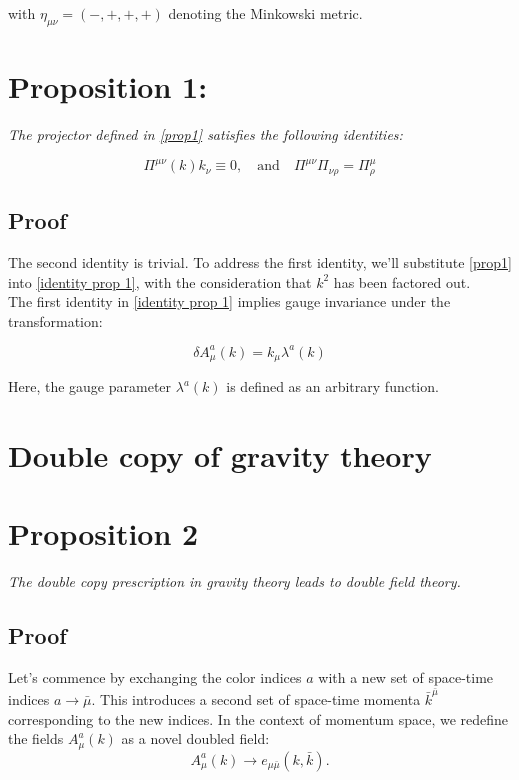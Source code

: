 \documentclass[13pt]{article}
\begin{document}
with \(\eta_{\mu \nu} = (-,+,+,+)\) denoting the Minkowski metric.

\vspace{1cm}
\section*{\textbf{Proposition 1:}} \textit{The projector defined in \eqref{prop1} satisfies the following identities:}

\begin{equation}
\Pi^{\mu \nu}(k)k_{\nu} \equiv 0, \quad \text{and} \quad \Pi^{\mu \nu}\Pi_{\nu \rho} = \Pi^{\mu}_{\rho}
\tag{11}
\label{identity prop 1}
\end{equation}

\subsection*{Proof} The second identity is trivial. To address the first identity, we'll substitute \eqref{prop1} into \eqref{identity prop 1}, with the consideration that \(k^2\) has been factored out.\\
The first identity in \eqref{identity prop 1} implies gauge invariance under the transformation:

\begin{equation}
\delta A^{a}_{\mu}(k) = k_{\mu}\lambda^a(k)
\tag{12}
\end{equation}

Here, the gauge parameter \(\lambda^a(k)\) is defined as an arbitrary function.


\section{Double copy of gravity theory}
\section*{\textbf{Proposition 2}}
\textit{The double copy prescription in gravity theory leads to double field theory.} \cite{Bonezzi2022}

\subsection*{Proof}
Let's commence by exchanging the color indices $a$ with a new set of space-time indices $a \rightarrow \bar{\mu}$. This introduces a second set of space-time momenta $\bar{k}^{\bar{\mu}}$ corresponding to the new indices.\cite{Bern2019} In the context of momentum space, we redefine the fields $A^a_{\mu}(k)$ as a novel doubled field:
\begin{equation}
A^a_{\mu}(k) \rightarrow e_{\mu \bar{\mu}}(k, \bar{k}). \tag{13}
\end{equation}
\end{document}
